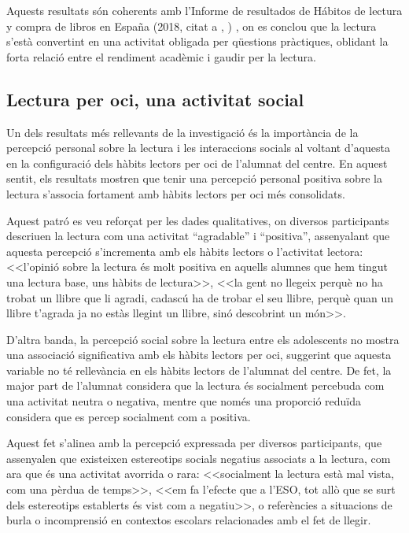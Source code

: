 \documentclass[12pt]{article}
\newcommand{\nestedtextcite}[2]{%
  (#1, citat a \citeauthor{#2}, \citeyear{#2})%
}
\begin{document}
Aquests resultats són coherents amb l'Informe de resultados de Hábitos de lectura y compra de libros en España \nestedtextcite{2018}{sanches}, on es conclou que la lectura s'està convertint en una activitat obligada per qüestions pràctiques, oblidant la forta relació entre el rendiment acadèmic i gaudir per la lectura.

\subsection{Lectura per oci, una activitat social}
Un dels resultats més rellevants de la investigació és la importància de la percepció personal sobre la lectura i les interaccions socials al voltant d'aquesta en la configuració dels hàbits lectors per oci de l'alumnat del centre. En aquest sentit, els resultats mostren que tenir una percepció personal positiva sobre la lectura s'associa fortament amb hàbits lectors per oci més consolidats.

Aquest patró es veu reforçat per les dades qualitatives, on diversos participants descriuen la lectura com una activitat “agradable” i “positiva”, assenyalant que aquesta percepció s'incrementa amb els hàbits lectors o l'activitat lectora: <<l'opinió sobre la lectura és molt positiva en aquells alumnes que hem tingut una lectura base, uns hàbits de lectura>>, <<la gent no llegeix perquè no ha trobat un llibre que li agradi, cadascú ha de trobar el seu llibre, perquè quan un llibre t'agrada ja no estàs llegint un llibre, sinó descobrint un món>>.

D'altra banda, la percepció social sobre la lectura entre els adolescents no mostra una associació significativa amb els hàbits lectors per oci, suggerint que aquesta variable no té rellevància en els hàbits lectors de l’alumnat del centre. De fet, la major part de l’alumnat considera que la lectura és socialment percebuda com una activitat neutra o negativa, mentre que només una proporció reduïda considera que es percep socialment com a positiva. 

Aquest fet s'alinea amb la percepció expressada per diversos participants, que assenyalen que existeixen estereotips socials negatius associats a la lectura, com ara que és una activitat avorrida o rara: <<socialment la lectura està mal vista, com una pèrdua de temps>>, <<em fa l'efecte que a l'ESO, tot allò que se surt dels estereotips establerts és vist com a negatiu>>, o referències a situacions de burla o incomprensió en contextos escolars relacionades amb el fet de llegir.
\end{document}
